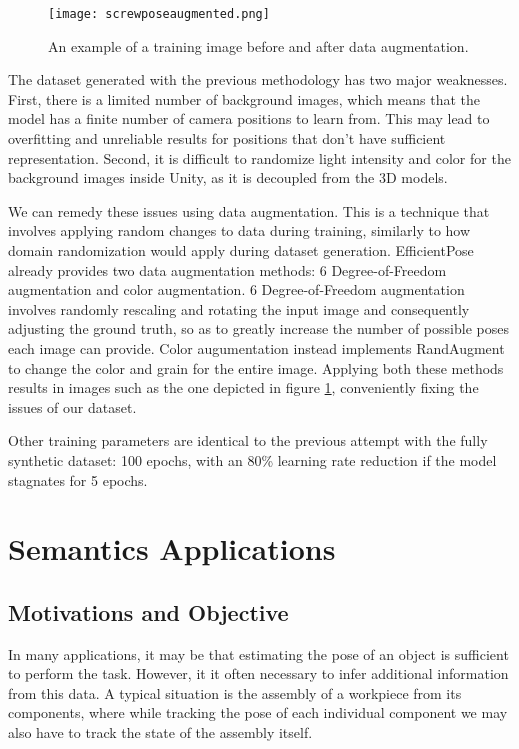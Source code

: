 \begin{figure}[ht]
    \texttt{[image: screwposeaugmented.png]}
    \caption{An example of a training image before and after data augmentation.}
    \label{fig:ScrewPoseAugmented}
\end{figure}

The dataset generated with the previous methodology has two major weaknesses. First, there is a limited number of background images, which means that the model has a finite number of camera positions to learn from. This may lead to overfitting and unreliable results for positions that don't have sufficient representation. Second, it is difficult to randomize light intensity and color for the background images inside Unity, as it is decoupled from the 3D models.

We can remedy these issues using data augmentation. This is a technique that involves applying random changes to data during training, similarly to how domain randomization would apply during dataset generation. EfficientPose already provides two data augmentation methods: 6 Degree-of-Freedom augmentation and color augmentation. 6 Degree-of-Freedom augmentation involves randomly rescaling and rotating the input image and consequently adjusting the ground truth, so as to greatly increase the number of possible poses each image can provide. Color augumentation instead implements RandAugment\cite{RandAugment} to change the color and grain for the entire image. Applying both these methods results in images such as the one depicted in figure \ref{fig:ScrewPoseAugmented}, conveniently fixing the issues of our dataset.

Other training parameters are identical to the previous attempt with the fully synthetic dataset: 100 epochs, with an 80\% learning rate reduction if the model stagnates for 5 epochs.

\section{Semantics Applications}

\subsection{Motivations and Objective}

In many applications, it may be that estimating the pose of an object is sufficient to perform the task. However, it it often necessary to infer additional information from this data. A typical situation is the assembly of a workpiece from its components, where while tracking the pose of each individual component we may also have to track the state of the assembly itself.

